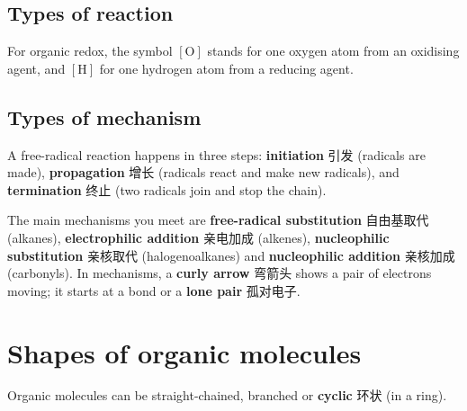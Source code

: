 \documentclass[11pt]{article}
\begin{document}
\subsection*{Types of reaction}

\begin{center}
\end{center}

For organic redox, the symbol $[\text{O}]$ stands for one oxygen atom from an oxidising agent, and $[\text{H}]$ for one hydrogen atom from a reducing agent.

\subsection*{Types of mechanism}

A free-radical reaction happens in three steps: \textbf{initiation} 引发 (radicals are made), \textbf{propagation} 增长 (radicals react and make new radicals), and \textbf{termination} 终止 (two radicals join and stop the chain).

The main mechanisms you meet are \textbf{free-radical substitution} 自由基取代 (alkanes), \textbf{electrophilic addition} 亲电加成 (alkenes), \textbf{nucleophilic substitution} 亲核取代 (halogenoalkanes) and \textbf{nucleophilic addition} 亲核加成 (carbonyls). In mechanisms, a \textbf{curly arrow} 弯箭头 shows a pair of electrons moving; it starts at a bond or a \textbf{lone pair} 孤对电子.

\section*{Shapes of organic molecules}

Organic molecules can be straight-chained, branched or \textbf{cyclic} 环状 (in a ring).
\end{document}
